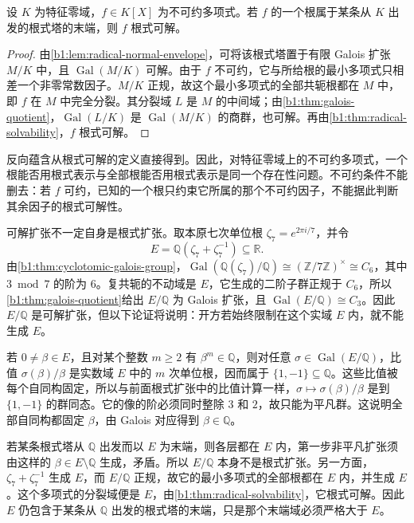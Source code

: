 \begin{corollary}\label{b1:cor:irreducible-one-radical-root}
	设 \(K\) 为特征零域，\(f\in K[X]\) 为不可约多项式。若 \(f\) 的一个根属于某条从 \(K\) 出发的根式塔的末端，则 \(f\) 根式可解。
\end{corollary}
\begin{proof}
	由\cref{b1:lem:radical-normal-envelope}，可将该根式塔置于有限 Galois 扩张 \(M/K\) 中，且 \(\operatorname{Gal}(M/K)\) 可解。由于 \(f\) 不可约，它与所给根的最小多项式只相差一个非零常数因子。\(M/K\) 正规，故这个最小多项式的全部共轭根都在 \(M\) 中，即 \(f\) 在 \(M\) 中完全分裂。其分裂域 \(L\) 是 \(M\) 的中间域；由\cref{b1:thm:galois-quotient}，\(\operatorname{Gal}(L/K)\) 是 \(\operatorname{Gal}(M/K)\) 的商群，也可解。再由\cref{b1:thm:radical-solvability}，\(f\) 根式可解。
\end{proof}

反向蕴含从根式可解的定义直接得到。因此，对特征零域上的不可约多项式，一个根能否用根式表示与全部根能否用根式表示是同一个存在性问题。不可约条件不能删去：若 \(f\) 可约，已知的一个根只约束它所属的那个不可约因子，不能据此判断其余因子的根式可解性。

\ProseParagraphBreak
可解扩张不一定自身是根式扩张。取本原七次单位根 \(\zeta_7=e^{2\pi i/7}\)，并令
\[
	E=\mathbb Q(\zeta_7+\zeta_7^{-1})\subseteq\mathbb R.
\]
由\cref{b1:thm:cyclotomic-galois-group}，\(\operatorname{Gal}(\mathbb Q(\zeta_7)/\mathbb Q)\cong(\mathbb Z/7\mathbb Z)^\times\cong C_6\)，其中 \(3\bmod7\) 的阶为 \(6\)。复共轭的不动域是 \(E\)，它生成的二阶子群正规于 \(C_6\)，所以\cref{b1:thm:galois-quotient}给出 \(E/\mathbb Q\) 为 Galois 扩张，且 \(\operatorname{Gal}(E/\mathbb Q)\cong C_3\)。因此 \(E/\mathbb Q\) 是可解扩张，但以下论证将说明：开方若始终限制在这个实域 \(E\) 内，就不能生成 \(E\)。

\ProseParagraphBreak
若 \(0\neq\beta\in E\)，且对某个整数 \(m\geq2\) 有 \(\beta^m\in\mathbb Q\)，则对任意 \(\sigma\in\operatorname{Gal}(E/\mathbb Q)\)，比值 \(\sigma(\beta)/\beta\) 是实数域 \(E\) 中的 \(m\) 次单位根，因而属于 \(\{1,-1\}\subseteq\mathbb Q\)。这些比值被每个自同构固定，所以与前面根式扩张中的比值计算一样，\(\sigma\mapsto\sigma(\beta)/\beta\) 是到 \(\{1,-1\}\) 的群同态。它的像的阶必须同时整除 \(3\) 和 \(2\)，故只能为平凡群。这说明全部自同构都固定 \(\beta\)，由 Galois 对应得到 \(\beta\in\mathbb Q\)。

\ProseParagraphBreak
若某条根式塔从 \(\mathbb Q\) 出发而以 \(E\) 为末端，则各层都在 \(E\) 内，第一步非平凡扩张须由这样的 \(\beta\in E\setminus\mathbb Q\) 生成，矛盾。所以 \(E/\mathbb Q\) 本身不是根式扩张。另一方面，\(\zeta_7+\zeta_7^{-1}\) 生成 \(E\)，而 \(E/\mathbb Q\) 正规，故它的最小多项式的全部根都在 \(E\) 内，并生成 \(E\)。这个多项式的分裂域便是 \(E\)，由\cref{b1:thm:radical-solvability}，它根式可解。因此 \(E\) 仍包含于某条从 \(\mathbb Q\) 出发的根式塔的末端，只是那个末端域必须严格大于 \(E\)。

